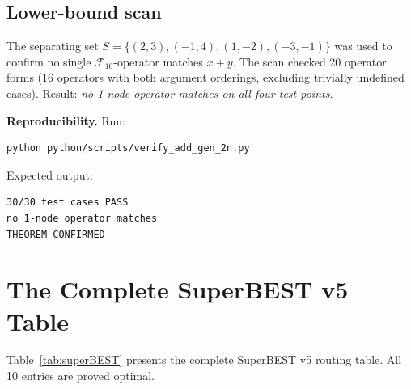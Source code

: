 \documentclass[12pt,a4paper]{article}
\theoremstyle{definition}
\newcommand{\F}{\mathcal{F}_{16}}
\begin{document}
\subsection{Lower-bound scan}

The separating set $S = \{(2,3),(-1,4),(1,-2),(-3,-1)\}$ was used to confirm
no single $\F$-operator matches $x+y$.
The scan checked 20 operator forms (16 operators with both argument orderings,
excluding trivially undefined cases).
Result: \emph{no 1-node operator matches on all four test points.}

\bigskip
\noindent\textbf{Reproducibility.} Run:
\begin{verbatim}
python python/scripts/verify_add_gen_2n.py
\end{verbatim}
Expected output:
\begin{verbatim}
30/30 test cases PASS
no 1-node operator matches
THEOREM CONFIRMED
\end{verbatim}

\section{The Complete SuperBEST v5 Table}
\label{sec:table}

Table~\ref{tab:superBEST} presents the complete SuperBEST v5 routing table.
All 10 entries are proved optimal.
\end{document}

